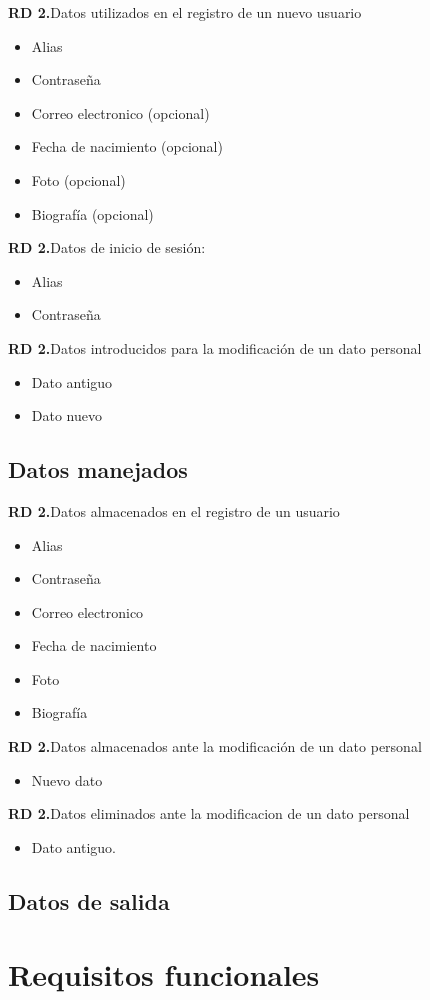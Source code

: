 \documentclass[11pt,a4paper]{article}
\newcounter{RDdCounter} %
\newcommand{\rdd}[1]{\addtocounter{RDdCounter}{1}\textbf{\rmfamily RD 2.\theRDdCounter}\quad#1\\}
\begin{document}
\rdd{Datos utilizados en el registro de un nuevo usuario}
\begin{itemize}
\item Alias
\item Contraseña
\item Correo electronico (opcional)
\item Fecha de nacimiento (opcional)
\item Foto (opcional)
\item Biografía (opcional)
\end{itemize}
\rdd{Datos de inicio de sesión:}
\begin{itemize}
\item Alias
\item Contraseña
\end{itemize}
\rdd{Datos introducidos para la modificación de un dato personal}
\begin{itemize}
\item Dato antiguo
\item Dato nuevo
\end{itemize}

\subsection{Datos manejados}
\rdd{Datos almacenados en el registro de un usuario}
\begin{itemize}
\item Alias
\item Contraseña
\item Correo electronico
\item Fecha de nacimiento
\item Foto
\item Biografía
\end{itemize}
\rdd{Datos almacenados ante la modificación de un dato personal}
\begin{itemize}
\item Nuevo dato
\end{itemize}
\rdd{Datos eliminados ante la modificacion de un dato personal}
\begin{itemize}
\item Dato antiguo.
\end{itemize}

\subsection{Datos de salida}

\section{Requisitos funcionales}
\end{document}
